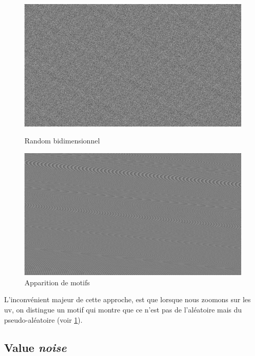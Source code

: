 \begin{figure}[h]
  \begin{minipage}[b]{0.45\linewidth}
    \centering
    \includegraphics[width=\linewidth]{images/noise/noise02.JPG}
    \caption{Random bidimensionnel}
    \label{noise02}
  \end{minipage}
  \hspace{0.1\linewidth} %
  \begin{minipage}[b]{0.45\linewidth}
    \centering
    \includegraphics[width=\linewidth]{images/noise/noise03.JPG}
    \caption{Apparition de motifs}
    \label{noise03}
  \end{minipage}
\end{figure}

L'inconvénient majeur de cette approche, est que lorsque nous zoomons sur les uv, on distingue un motif qui montre que ce n'est pas de l'aléatoire mais du pseudo-aléatoire (voir \ref{noise03}).

\subsection*{Value \textit{noise}}

